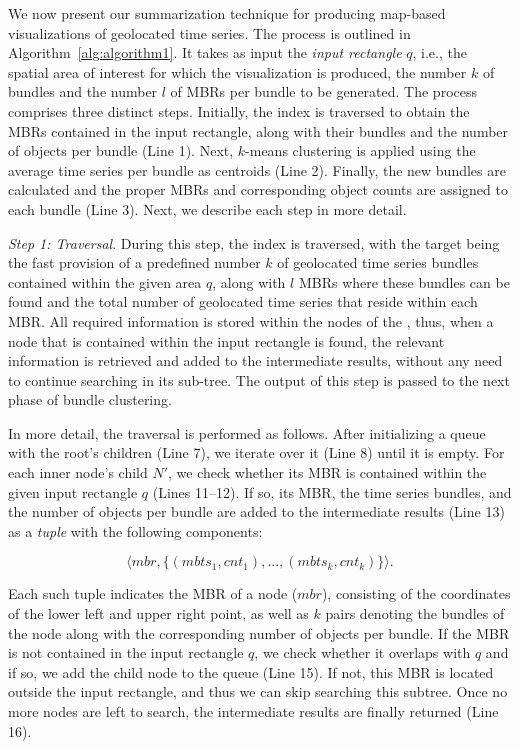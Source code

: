 We now present our summarization technique for producing map-based visualizations of geolocated time series. The process is outlined in Algorithm~\ref{alg:algorithm1}. It takes as input the {\em input rectangle} $q$, i.e., the spatial area of interest for which the visualization is produced, the number $k$ of bundles and the number $l$ of MBRs per bundle  to be generated. The process comprises three distinct steps. Initially, the \btsr index is traversed to obtain the MBRs contained in the input rectangle, along with their bundles and the number of objects per bundle (Line 1). Next, $k$-means clustering is applied using the average time series per bundle as centroids (Line 2). Finally, the new bundles are calculated and the proper MBRs and corresponding object counts are assigned to each bundle (Line 3). Next, we describe each step in more detail.

\vspace{3mm}

\emph{Step 1: \btsr Traversal}.
During this step, the \btsr index is traversed, with the target being the fast provision of a predefined number $k$ of geolocated time series bundles contained within the given area $q$, along with $l$ MBRs where these bundles can be found and the total number of geolocated time series that reside within each MBR. All required information is stored within the nodes of the \btsr, thus, when a node that is contained within the input rectangle is found, the relevant information is retrieved and added to the intermediate results, without any need to continue searching in its sub-tree. The output of this step is passed to the next phase of bundle clustering. 

In more detail, the traversal is performed as follows. After initializing a queue with the root's children (Line 7), we iterate over it (Line 8) until it is empty. For each inner node's child $N'$, we check whether its MBR is contained within the given input rectangle $q$ (Lines 11--12). If so, its MBR, the time series bundles, and the number of objects per bundle are added to the intermediate results (Line 13) as a {\em tuple} with the following components:

\begin{equation*}
\langle mbr, \{ (mbts_1,cnt_1), ..., (mbts_k, cnt_k) \} \rangle.
\end{equation*}

\noindent Each such tuple indicates the MBR of a node ($mbr$), consisting of the coordinates of the lower left and upper right point, as well as $k$ pairs denoting the bundles of the node along with the corresponding number of objects per bundle. If the MBR is not contained in the input rectangle $q$, we check whether it overlaps with $q$ and if so, we add the child node to the queue (Line 15). If not, this MBR is located outside the input rectangle, and thus we can skip searching this subtree. Once no more nodes are left to search, the intermediate results are finally returned (Line 16).

